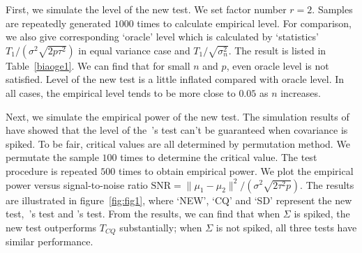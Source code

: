 \documentclass[review]{elsarticle}
\theoremstyle{plain}
\theoremstyle{definition}
\theoremstyle{remark}
\begin{document}
First, we simulate the level of the new test. We set factor number $r=2$.
Samples are repeatedly generated $1000$ times to calculate empirical level.
For comparison, we also give corresponding `oracle' level which is calculated by `statistics' ${T_1}/(\sigma^2\sqrt{2p\tau^2})$ in equal variance case and ${T_1}/\sqrt{\sigma_n^2}$.
The result is listed in
Table~\ref{biaoge1}.
We can find that for small $n$ and $p$, even oracle level is not satisfied.
Level of the new test is a little inflated compared with oracle level.
In all cases, the empirical level tends to be more close to $0.05$ as $n$ increases.


%



Next, we simulate the empirical power of the new test.
The simulation results of~\cite{Ma2015A} have showed that the level of the~\cite{Chen2010A}'s test can't be guaranteed when covariance is spiked.
To be fair,  critical values are all determined by permutation method.
We permutate the sample $100$ times to determine the critical value. The test procedure is repeated $500$ times to obtain empirical power.
We plot the empirical power versus signal-to-noise ratio $\textrm{SNR}=\|\mu_1-\mu_2\|^2/(\sigma^2\sqrt{2\tau^2 p})$.
The results are illustrated in figure~\ref{fig:fig1}, where `NEW', `CQ' and `SD' represent the new test,~\cite{Chen2010A}'s test and \cite{Srivastava2008A}'s test.
From the results, we can find that when $\Sigma$ is spiked, the new test outperforms $T_{CQ}$ substantially; when $\Sigma$ is not spiked, all three tests have similar performance.
\end{document}
